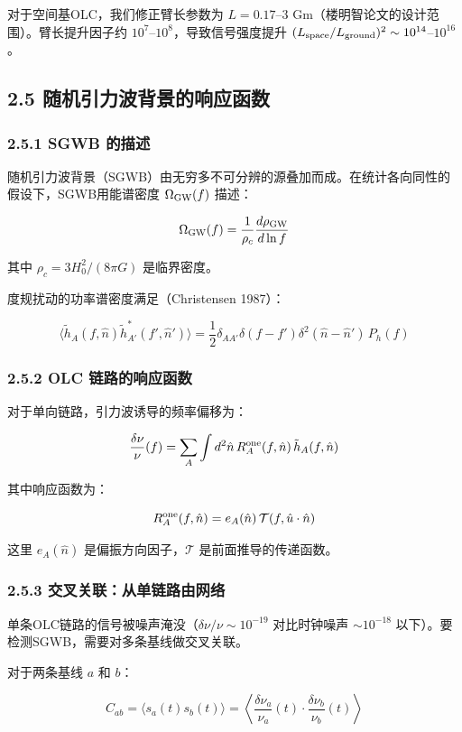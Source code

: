 \documentclass[12pt,a4paper]{article}
\begin{document}
对于空间基OLC，我们修正臂长参数为 $L = 0.17$–3 Gm（楼明智论文的设计范围）。臂长提升因子约 $10^7$–$10^8$，导致信号强度提升 $(L_{\rm space}/L_{\rm ground})^2 \sim 10^{14}$–$10^{16}$。

\subsection{2.5 随机引力波背景的响应函数}


\subsubsection{2.5.1 SGWB 的描述}


随机引力波背景（SGWB）由无穷多不可分辨的源叠加而成。在统计各向同性的假设下，SGWB用能谱密度 $\Omega_{\rm GW}(f)$ 描述：

$$\Omega_{\rm GW}(f) = \frac{1}{\rho_c}\frac{d\rho_{\rm GW}}{d\ln f}$$

其中 $\rho_c = 3H_0^2/(8\pi G)$ 是临界密度。

度规扰动的功率谱密度满足（Christensen 1987）：

$$\langle \tilde{h}_A(f, \hat{n}) \tilde{h}_{A'}^*(f', \hat{n}')\rangle = \frac{1}{2}\delta_{AA'}\delta(f-f')\delta^2(\hat{n}-\hat{n}')\, P_h(f)$$

\subsubsection{2.5.2 OLC 链路的响应函数}


对于单向链路，引力波诱导的频率偏移为：

$$\frac{\delta\nu}{\nu}(f) = \sum_A \int d^2\hat{n}\, R_A^{\rm one}(f, \hat{n})\, \tilde{h}_A(f, \hat{n})$$

其中响应函数为：

$$R_A^{\rm one}(f, \hat{n}) = e_A(\hat{n})\, \mathcal{T}(f, \hat{u}\cdot\hat{n})$$

这里 $e_A(\hat{n})$ 是偏振方向因子，$\mathcal{T}$ 是前面推导的传递函数。

\subsubsection{2.5.3 交叉关联：从单链路由网络}


单条OLC链路的信号被噪声淹没（$\delta\nu/\nu \sim 10^{-19}$ 对比时钟噪声 $\sim 10^{-18}$ 以下）。要检测SGWB，需要对多条基线做交叉关联。

对于两条基线 $a$ 和 $b$：

$$C_{ab} = \langle s_a(t) s_b(t)\rangle = \left\langle \frac{\delta\nu_a}{\nu_a}(t) \cdot \frac{\delta\nu_b}{\nu_b}(t)\right\rangle$$
\end{document}
